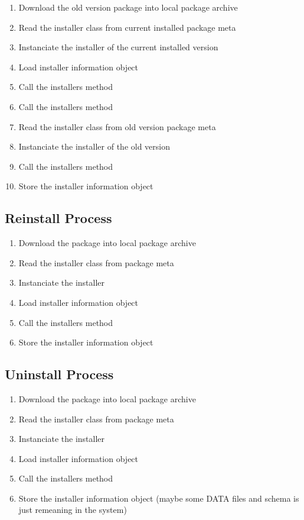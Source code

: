 \begin{enumerate}
\item Download the old version package into local package archive
\item Read the installer class from current installed package meta
\item Instanciate the installer of the current installed version
\item Load installer information object
\item Call the installers  method
\item Call the installers  method
\item Read the installer class from old version package meta
\item Instanciate the installer of the old version
\item Call the installers  method
\item Store the installer information object
\end{enumerate}

\subsection[sec:reinstall process]{Reinstall Process}

\begin{enumerate}
\item Download the package into local package archive
\item Read the installer class from package meta
\item Instanciate the installer
\item Load installer information object
\item Call the installers  method
\item Store the installer information object
\end{enumerate}

\subsection[sec:uninstall process]{Uninstall Process}

\begin{enumerate}
\item Download the package into local package archive
\item Read the installer class from package meta
\item Instanciate the installer
\item Load installer information object
\item Call the installers  method
\item Store the installer information object (maybe some DATA files and schema is just remeaning in the system)
\end{enumerate}

